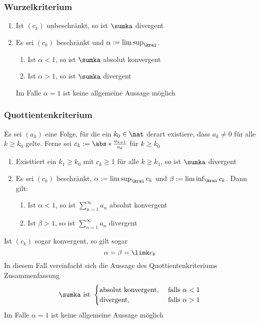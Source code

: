 \documentclass{kit}
\begin{document}
    \subsubsection{Wurzelkriterium}
      \begin{enumerate}
        \item Ist $(c_k)$ unbeschränkt, so ist $\sumka$ divergent
        \item Es sei $(c_k)$ beschränkt und $\alpha:=\limsup_\krai$.
          \begin{enumerate}[label=
oman*)]
            \item Ist $\alpha<1$, so ist $\sumka$ absolut konvergent
            \item Ist $\alpha>1$, so ist $\sumka$ divergent
          \end{enumerate}
          Im Falle $\alpha=1$ ist keine allgemeine Aussage möglich
      \end{enumerate}
    \subsubsection{Quottientenkriterium}
      Es sei $(a_k)$ eine Folge, für die ein $k_0\in\nat$ derart existiere, dass $a_k\neq0$ für alle $k\ge k_0$ gelte. Ferne sei $c_k:=\abs*{\frac{a_{k+1}}{a_k}}$ für $k\ge k_0$
      \begin{enumerate}
        \item Existtiert ein $k_1\ge k_0$ mit $c_k\ge1$ für alle $k\ge k_1$, so ist $\sumka$ divergent
        \item Es sei $(c_k)$ beschränkt, $\alpha:=\limsup_\krai c_k$ und $\beta:=\liminf_\krai c_k$. Dann gilt:
          \begin{enumerate}[label=
oman*)]
            \item Ist $\alpha<1$, so ist $\sum^\infty_{n=1}a_n$ absolut konvergent
            \item Ist $\beta>1$, so ist $\sum^\infty_{n=1}a_n$ divergent
          \end{enumerate}
      \end{enumerate}
      Ist $(c_k)$ sogar konvergent, so gilt sogar
      $$\alpha=\beta=\limk c_k$$
      In diesem Fall vereinfacht sich die Aussage des Quottientenkriteriums Zusammenfassung
      $$\sumka \text{ ist }\begin{cases}
      \text{absolut konvergent}, & \text{ falls }\alpha<1\\
      \text{divergent}, & \text{ falls } \alpha>1
      \end{cases}$$
      Im Falle $\alpha=1$ ist keine allgemeine Aussage möglich
\end{document}
